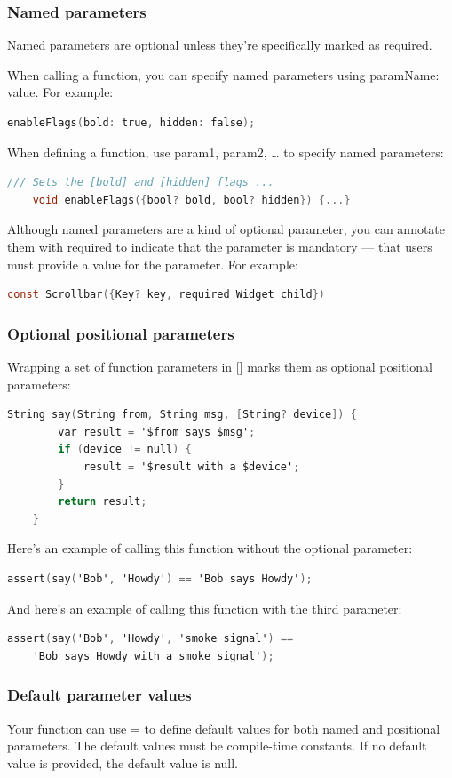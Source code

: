 \subsubsection{Named parameters}
Named parameters are optional unless they're specifically marked as required.

When calling a function, you can specify named parameters using paramName: value. For example:
\begin{lstlisting}[language=C]
	enableFlags(bold: true, hidden: false);
\end{lstlisting}
When defining a function, use {param1, param2, …} to specify named parameters:
\begin{lstlisting}[language=C]
	/// Sets the [bold] and [hidden] flags ...
	void enableFlags({bool? bold, bool? hidden}) {...}
\end{lstlisting}
Although named parameters are a kind of optional parameter, you can annotate them with required to indicate that the parameter is mandatory — that users must provide a value for the parameter. For example:
\begin{lstlisting}[language=C]
	const Scrollbar({Key? key, required Widget child})
\end{lstlisting}
\subsubsection{Optional positional parameters}
Wrapping a set of function parameters in [] marks them as optional positional parameters:

\begin{lstlisting}[language=C]
	String say(String from, String msg, [String? device]) {
		var result = '$from says $msg';
		if (device != null) {
			result = '$result with a $device';
		}
		return result;
	}
\end{lstlisting}
Here's an example of calling this function without the optional parameter:

\begin{lstlisting}[language=C]
	assert(say('Bob', 'Howdy') == 'Bob says Howdy');
\end{lstlisting}
And here's an example of calling this function with the third parameter:

\begin{lstlisting}[language=C]
	assert(say('Bob', 'Howdy', 'smoke signal') ==
	'Bob says Howdy with a smoke signal');
\end{lstlisting}
\subsubsection{Default parameter values}
Your function can use = to define default values for both named and positional parameters. The default values must be compile-time constants. If no default value is provided, the default value is null.

